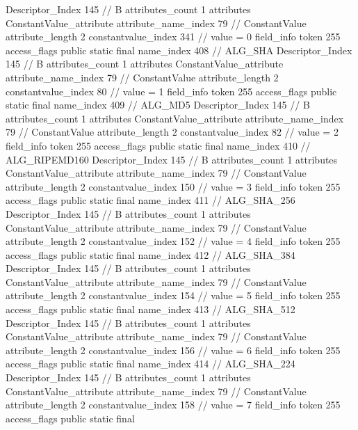 {{{{{				Descriptor_Index	145		// B
				attributes_count	1
				attributes {
				ConstantValue_attribute {
					attribute_name_index	79		// ConstantValue
					attribute_length	2
					constantvalue_index	341		// value = 0
				}
				}
			}
			field_info {
				token	255
				access_flags	public static final
				name_index	408		// ALG_SHA
				Descriptor_Index	145		// B
				attributes_count	1
				attributes {
				ConstantValue_attribute {
					attribute_name_index	79		// ConstantValue
					attribute_length	2
					constantvalue_index	80		// value = 1
				}
				}
			}
			field_info {
				token	255
				access_flags	public static final
				name_index	409		// ALG_MD5
				Descriptor_Index	145		// B
				attributes_count	1
				attributes {
				ConstantValue_attribute {
					attribute_name_index	79		// ConstantValue
					attribute_length	2
					constantvalue_index	82		// value = 2
				}
				}
			}
			field_info {
				token	255
				access_flags	public static final
				name_index	410		// ALG_RIPEMD160
				Descriptor_Index	145		// B
				attributes_count	1
				attributes {
				ConstantValue_attribute {
					attribute_name_index	79		// ConstantValue
					attribute_length	2
					constantvalue_index	150		// value = 3
				}
				}
			}
			field_info {
				token	255
				access_flags	public static final
				name_index	411		// ALG_SHA_256
				Descriptor_Index	145		// B
				attributes_count	1
				attributes {
				ConstantValue_attribute {
					attribute_name_index	79		// ConstantValue
					attribute_length	2
					constantvalue_index	152		// value = 4
				}
				}
			}
			field_info {
				token	255
				access_flags	public static final
				name_index	412		// ALG_SHA_384
				Descriptor_Index	145		// B
				attributes_count	1
				attributes {
				ConstantValue_attribute {
					attribute_name_index	79		// ConstantValue
					attribute_length	2
					constantvalue_index	154		// value = 5
				}
				}
			}
			field_info {
				token	255
				access_flags	public static final
				name_index	413		// ALG_SHA_512
				Descriptor_Index	145		// B
				attributes_count	1
				attributes {
				ConstantValue_attribute {
					attribute_name_index	79		// ConstantValue
					attribute_length	2
					constantvalue_index	156		// value = 6
				}
				}
			}
			field_info {
				token	255
				access_flags	public static final
				name_index	414		// ALG_SHA_224
				Descriptor_Index	145		// B
				attributes_count	1
				attributes {
				ConstantValue_attribute {
					attribute_name_index	79		// ConstantValue
					attribute_length	2
					constantvalue_index	158		// value = 7
				}
				}
			}
			field_info {
				token	255
				access_flags	public static final
}}}}}
